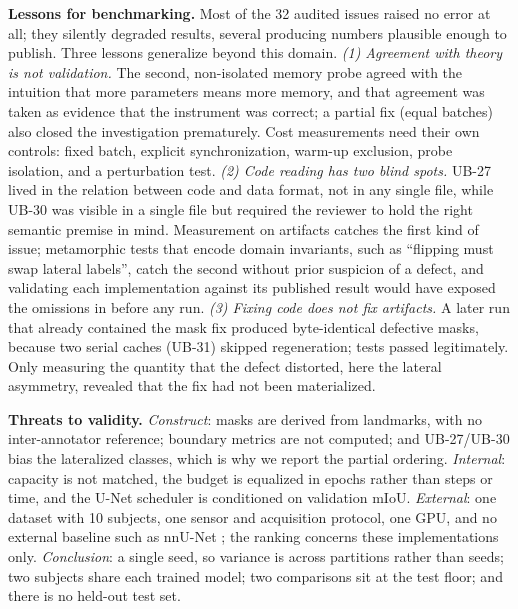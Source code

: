 \textbf{Lessons for benchmarking.}
Most of the 32 audited issues raised no error at all; they silently degraded results, several producing numbers plausible enough to publish.
Three lessons generalize beyond this domain.
\emph{(1) Agreement with theory is not validation.} The second, non-isolated memory probe agreed with the intuition that more parameters means more memory, and that agreement was taken as evidence that the instrument was correct; a partial fix (equal batches) also closed the investigation prematurely.
Cost measurements need their own controls: fixed batch, explicit synchronization, warm-up exclusion, probe isolation, and a perturbation test.
\emph{(2) Code reading has two blind spots.} UB-27 lived in the relation between code and data format, not in any single file, while UB-30 was visible in a single file but required the reviewer to hold the right semantic premise in mind.
Measurement on artifacts catches the first kind of issue; metamorphic tests that encode domain invariants, such as ``flipping must swap lateral labels'', catch the second without prior suspicion of a defect, and validating each implementation against its published result would have exposed the omissions in \swinp{} before any run.
\emph{(3) Fixing code does not fix artifacts.} A later run that already contained the mask fix produced byte-identical defective masks, because two serial caches (UB-31) skipped regeneration; tests passed legitimately.
Only measuring the quantity that the defect distorted, here the lateral asymmetry, revealed that the fix had not been materialized.

\textbf{Threats to validity.}
\emph{Construct}: masks are derived from landmarks, with no inter-annotator reference; boundary metrics are not computed; and UB-27/UB-30 bias the lateralized classes, which is why we report the partial ordering.
\emph{Internal}: capacity is not matched, the budget is equalized in epochs rather than steps or time, and the U-Net scheduler is conditioned on validation mIoU.
\emph{External}: one dataset with 10 subjects, one sensor and acquisition protocol, one GPU, and no external baseline such as nnU-Net \cite{Isensee2021}; the ranking concerns these implementations only.
\emph{Conclusion}: a single seed, so variance is across partitions rather than seeds; two subjects share each trained model; two comparisons sit at the test floor; and there is no held-out test set.
